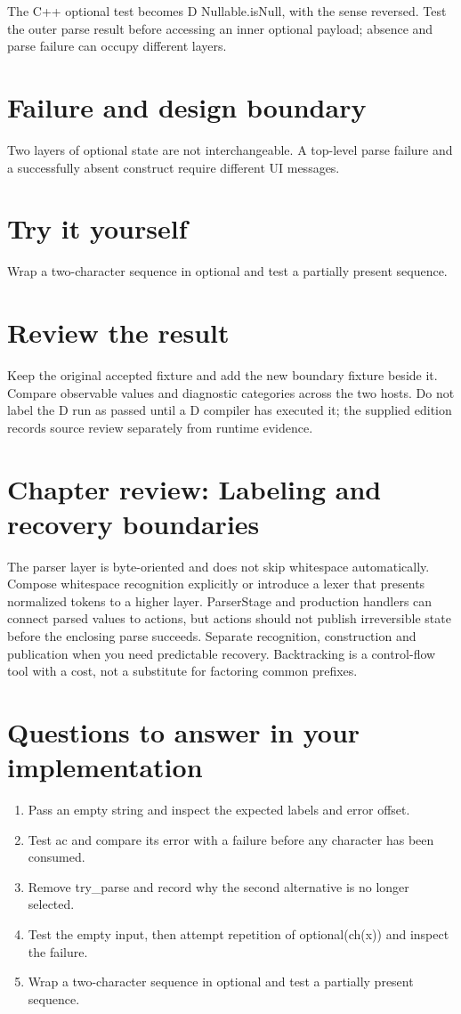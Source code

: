 \clearpage
{}
The C++ optional test becomes D Nullable.isNull, with the sense reversed. Test the outer parse result before accessing an inner optional payload; absence and parse failure can occupy different layers.


\section*{Failure and design boundary}
Two layers of optional state are not interchangeable. A top-level parse failure and a successfully absent construct require different UI messages.

\section*{Try it yourself}
Wrap a two-character sequence in optional and test a partially present sequence.

\section*{Review the result}
Keep the original accepted fixture and add the new boundary fixture beside it. Compare observable values and diagnostic categories across the two hosts. Do not label the D run as passed until a D compiler has executed it; the supplied edition records source review separately from runtime evidence.

\clearpage
\section*{Chapter review: Labeling and recovery boundaries}
The parser layer is byte-oriented and does not skip whitespace automatically. Compose whitespace recognition explicitly or introduce a lexer that presents normalized tokens to a higher layer. ParserStage and production handlers can connect parsed values to actions, but actions should not publish irreversible state before the enclosing parse succeeds. Separate recognition, construction and publication when you need predictable recovery. Backtracking is a control-flow tool with a cost, not a substitute for factoring common prefixes.

\section*{Questions to answer in your implementation}
\begin{enumerate}
\item Pass an empty string and inspect the expected labels and error offset.
\item Test ac and compare its error with a failure before any character has been consumed.
\item Remove try\_parse and record why the second alternative is no longer selected.
\item Test the empty input, then attempt repetition of optional(ch(x)) and inspect the failure.
\item Wrap a two-character sequence in optional and test a partially present sequence.
\end{enumerate}
